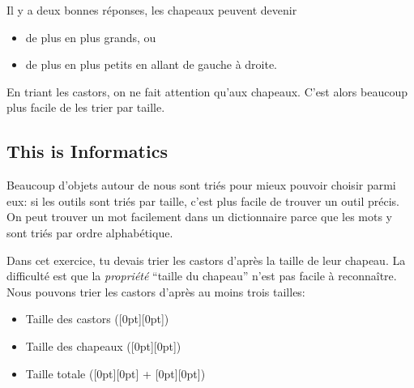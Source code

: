 \documentclass[a4paper,11pt]{report}
\newcommand{\taskGraphicsFolder}{..}
\begin{document}
{\centering%
\raisebox{-0.5ex}{}   \raisebox{-0.5ex}{}\par}

Il y a deux bonnes réponses, les chapeaux peuvent devenir

\begin{itemize}
  \item de plus en plus grands, ou
  \item de plus en plus petits
en allant de gauche à droite.
\end{itemize}

En triant les castors, on ne fait attention qu’aux chapeaux. C’est alors beaucoup plus facile de les trier par taille.

{\centering%
\raisebox{-0.5ex}{}    \raisebox{-0.5ex}{}\par}


\subsection*{This is Informatics}

Beaucoup d’objets autour de nous sont triés pour mieux pouvoir choisir parmi eux: si les outils sont triés par taille, c’est plus facile de trouver un outil précis. On peut trouver un mot facilement dans un dictionnaire parce que les mots y sont triés par ordre alphabétique.

Dans cet exercice, tu devais trier les castors d’après la taille de leur chapeau. La difficulté est que la \emph{propriété} “taille du chapeau” n’est pas facile à reconnaître. Nous pouvons trier les castors d’après au moins trois tailles:

\begin{itemize}
  \item Taille des castors (\raisebox{-0.5ex}[0pt][0pt]{})
  \item Taille des chapeaux (\raisebox{-0.5ex}[0pt][0pt]{})
  \item Taille totale (\raisebox{-0.5ex}[0pt][0pt]{} + \raisebox{-0.5ex}[0pt][0pt]{})
\end{itemize}
\end{document}

